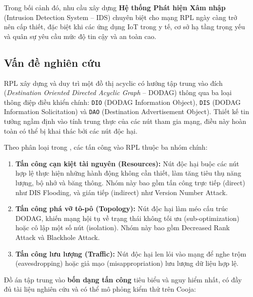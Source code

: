 Trong bối cảnh đó, nhu cầu xây dựng \textbf{Hệ thống Phát hiện Xâm nhập}
(Intrusion Detection System -- IDS) chuyên biệt cho mạng RPL ngày càng trở
nên cấp thiết, đặc biệt khi các ứng dụng IoT trong y tế, cơ sở hạ tầng
trọng yếu và quân sự yêu cầu mức độ tin cậy và an toàn cao.

\subsection{Vấn đề nghiên cứu}
\label{subsec:problem}

RPL xây dựng và duy trì một đồ thị acyclic có hướng tập trung vào đích
(\textit{Destination Oriented Directed Acyclic Graph} -- DODAG) thông qua
ba loại thông điệp điều khiển chính: \texttt{DIO} (DODAG Information Object),
\texttt{DIS} (DODAG Information Solicitation) và \texttt{DAO}
(Destination Advertisement Object). Thiết kế tin tưởng ngầm định vào tính
trung thực của các nút tham gia mạng, điều này hoàn toàn có thể bị khai thác
bởi các nút độc hại.

Theo phân loại trong \cite{overview_rpl_framework}, các tấn công vào RPL
thuộc ba nhóm chính:

\begin{enumerate}
    \item \textbf{Tấn công cạn kiệt tài nguyên (Resources):} Nút độc hại
          buộc các nút hợp lệ thực hiện những hành động không cần thiết,
          làm tăng tiêu thụ năng lượng, bộ nhớ và băng thông. Nhóm này
          bao gồm tấn công trực tiếp (direct) như DIS Flooding, và gián
          tiếp (indirect) như Version Number Attack.

    \item \textbf{Tấn công phá vỡ tô-pô (Topology):} Nút độc hại làm méo
          cấu trúc DODAG, khiến mạng hội tụ về trạng thái không tối ưu
          (sub-optimization) hoặc cô lập một số nút (isolation). Nhóm
          này bao gồm Decreased Rank Attack và Blackhole Attack.

    \item \textbf{Tấn công lưu lượng (Traffic):} Nút độc hại len lỏi vào
          mạng để nghe trộm (eavesdropping) hoặc giả mạo
          (misappropriation) lưu lượng dữ liệu hợp lệ.
\end{enumerate}

Đồ án tập trung vào \textbf{bốn dạng tấn công} tiêu biểu và nguy hiểm nhất,
có đầy đủ tài liệu nghiên cứu và có thể mô phỏng kiểm thử trên Cooja:

